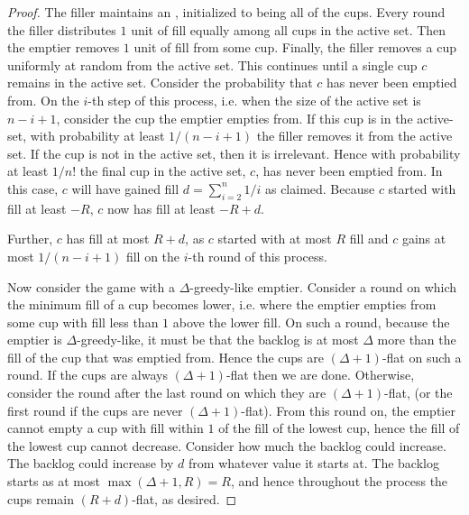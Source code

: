 \begin{proof}
  The filler maintains an , initialized to being
  all of the cups. Every round the filler distributes $1$ unit of
  fill equally among all cups in the active set. Then the emptier
  removes $1$ unit of fill from some cup. Finally, the filler
  removes a cup uniformly at random from the active set. This
  continues until a single cup $c$ remains in the active set. 
  Consider the probability that $c$ has never been emptied
  from. On the $i$-th step of this process, i.e. when the size of
  the active set is $n-i+1$, consider the cup the emptier empties
  from. If this cup is in the active-set, with probability at
  least $1/(n-i+1)$ the filler removes it from the active set.
  If the cup is not in the active set, then it is irrelevant.
  Hence with probability at least $1/n!$ the final
  cup in the active set, $c$, has never been emptied from.
  In this case, $c$ will have gained fill $d=\sum_{i=2}^n 1/i$
  as claimed. Because $c$ started with fill at
  least $-R$, $c$ now has fill at least $-R+ d$. 

  Further, $c$ has fill at most $R + d$, as $c$ started with at
  most $R$ fill and $c$ gains at most $1/(n-i+1)$ fill on the
  $i$-th round of this process.

  Now consider the game with a $\Delta$-greedy-like emptier.
  Consider a round on which the minimum fill of a cup becomes
  lower, i.e. where the emptier empties from some cup with fill
  less than $1$ above the lower fill. On such a round, because
  the emptier is $\Delta$-greedy-like, it must be that the
  backlog is at most $\Delta$ more than the fill of the cup that
  was emptied from. Hence the cups are $(\Delta+1)$-flat on such
  a round. If the cups are always $(\Delta+1)$-flat then we are
  done. Otherwise, consider the round after the last round on
  which they are $(\Delta + 1)$-flat, (or the first round if the
  cups are never $(\Delta+1)$-flat). From this round on, the emptier
  cannot empty a cup with fill within $1$ of the fill of the
  lowest cup, hence the fill of the lowest cup cannot decrease. 
  Consider how much the backlog could increase. The backlog could
  increase by $d$ from whatever value it starts at. The backlog
  starts as at most $\max(\Delta+1, R) = R$, and hence throughout
  the process the cups remain $(R+d)$-flat, as desired.

\end{proof}


